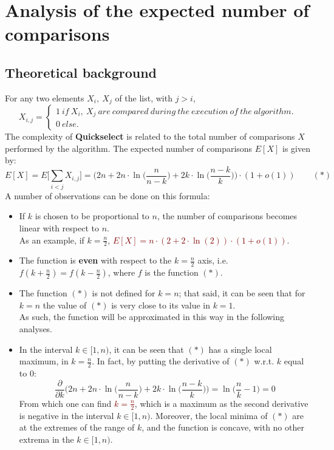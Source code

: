 \documentclass[
12pt,
a4paper,
oneside,
headinclude,
footinclude]{article}
\begin{document}
\section{Analysis of the expected number of comparisons}
\vspace{-5mm}
\subsection{Theoretical background}
\vspace{-5mm}
For any two elements $X_i,\ X_j$ of the list, with $j > i$, \\
\[
    X_{i,j} = \begin{cases}
                    1\ if\ X_i,\ X_j\ are\ compared\ during\ the\ execution\ of\ the\ algorithm. \\
                    0\ else.
                \end{cases}
\]
The complexity of \textbf{Quickselect} is related to the total number of comparisons $X$ performed by the algorithm. The expected number of comparisons $E[X]$ is given by:
$$E[X] = E\Big[\sum_{i < j}{X_{i,j}}\Big] = \Big(2n + 2n \cdot\ln\Big(\frac{n}{n - k}\Big) + 2k \cdot\ln\Big(\frac{n - k}{k}\Big)\Big)\cdot (1 + o(1)) \quad\quad (\ast)$$
\vspace{-5mm}
A number of observations can be done on this formula:
\begin{itemize}
    \item If $k$ is chosen to be proportional to $n$, the number of comparisons becomes linear with respect to $n$.\\
    As an example, if $k = \frac{n}{2}$, \textcolor{Maroon}{$E[X] = n \cdot (2 + 2 \cdot \ln(2)) \cdot (1 + o(1))$}.
    
    \item The function is \textbf{even} with respect to the $k = \frac{n}{2}$ axis, i.e. $f(k + \frac{n}{2}) = f(k - \frac{n}{2})$, where $f$ is the function $(\ast)$.

    \item The function $(\ast)$ is not defined for $k = n$; that said, it can be seen that for $k = n$ the value of $(\ast)$ is very close to its value in $k = 1$. \\
        As such, the function will be approximated in this way in the following analyses.

    \item In the interval $k \in [1, n)$, it can be seen that $(\ast)$ has a single local maximum, in $k = \frac{n}{2}$. In fact, by putting the derivative of $(\ast)$ w.r.t. $k$ equal to $0$: $$\frac{\partial}{\partial k}\Big(2n + 2n \cdot\ln\Big(\frac{n}{n - k}\Big) + 2k \cdot\ln\Big(\frac{n - k}{k}\Big)\Big) = \ln\Big(\frac{n}{k} - 1 \Big) = 0$$
    From which one can find \textcolor{Maroon}{$k = \frac{n}{2}$}, which is a maximum as the second derivative is negative in the interval $k \in [1, n)$.
    Moreover, the local minima of $(\ast)$ are at the extremes of the range of $k$, and the function is concave, with no other extrema in the $k\in[1, n)$.
\end{itemize}
\end{document}
